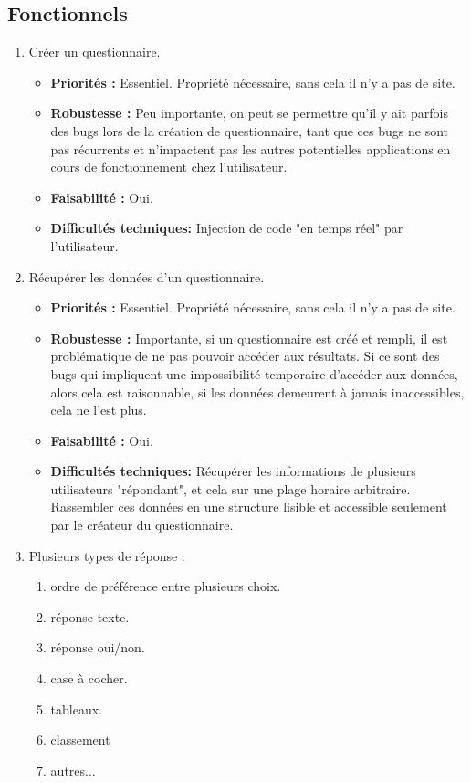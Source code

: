 \documentclass{article}
\begin{document}
\subsection{Fonctionnels}
\begin{enumerate}[noitemsep]
\item Créer un questionnaire.
\begin{itemize}[noitemsep]
\item \textbf{Priorités : }Essentiel. Propriété nécessaire, sans cela il n'y a pas de site.
\item \textbf{Robustesse : }Peu importante, on peut se permettre qu'il y ait parfois des bugs lors de la création de questionnaire, tant que ces bugs ne sont pas récurrents et n'impactent pas les autres potentielles applications en cours de fonctionnement chez l'utilisateur.
\item \textbf{Faisabilité : }Oui.
\item \textbf{Difficultés techniques: } Injection de code "en temps réel" par l'utilisateur.
\end{itemize}

\item Récupérer les données d'un questionnaire.
\begin{itemize}[noitemsep]
    \item \textbf{Priorités : }Essentiel. Propriété nécessaire, sans cela il n'y a pas de site.
    \item \textbf{Robustesse : }Importante, si un questionnaire est créé et rempli, il est problématique de ne pas pouvoir accéder aux résultats. Si ce sont des bugs qui impliquent une impossibilité temporaire d'accéder aux données, alors cela est raisonnable, si les données demeurent à jamais inaccessibles, cela ne l'est plus.
    \item \textbf{Faisabilité : }Oui.
    \item \textbf{Difficultés techniques: } Récupérer les informations de plusieurs utilisateurs "répondant", et cela sur une plage horaire arbitraire. Rassembler ces données en une structure lisible et accessible seulement par le créateur du questionnaire.
\end{itemize}
\newpage
\item Plusieurs types de réponse :
\begin{enumerate}[noitemsep]
    \item ordre de préférence entre plusieurs choix.
    \item réponse texte.
    \item réponse oui/non.
    \item case à cocher.
    \item tableaux.
    \item classement
    \item autres...
\end{enumerate}


\end{enumerate}
\end{document}
